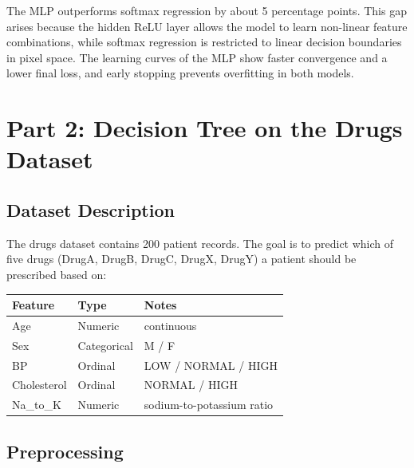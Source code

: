 \documentclass[12pt,a4paper]{article}
\begin{document}
The MLP outperforms softmax regression by about 5 percentage points.  This gap
arises because the hidden ReLU layer allows the model to learn non-linear
feature combinations, while softmax regression is restricted to linear decision
boundaries in pixel space.  The learning curves of the MLP show faster
convergence and a lower final loss, and early stopping prevents overfitting in
both models.

\section{Part 2: Decision Tree on the Drugs Dataset}

\subsection{Dataset Description}

The drugs dataset contains 200 patient records.  The goal is to predict which
of five drugs (DrugA, DrugB, DrugC, DrugX, DrugY) a patient should be
prescribed based on:

\begin{center}
\begin{tabular}{lll}
  \toprule
  Feature & Type & Notes \\
  \midrule
  Age      & Numeric & continuous \\
  Sex      & Categorical & M / F \\
  BP       & Ordinal & LOW / NORMAL / HIGH \\
  Cholesterol & Ordinal & NORMAL / HIGH \\
  Na\_to\_K & Numeric & sodium-to-potassium ratio \\
  \bottomrule
\end{tabular}
\end{center}

\subsection{Preprocessing}
\end{document}
